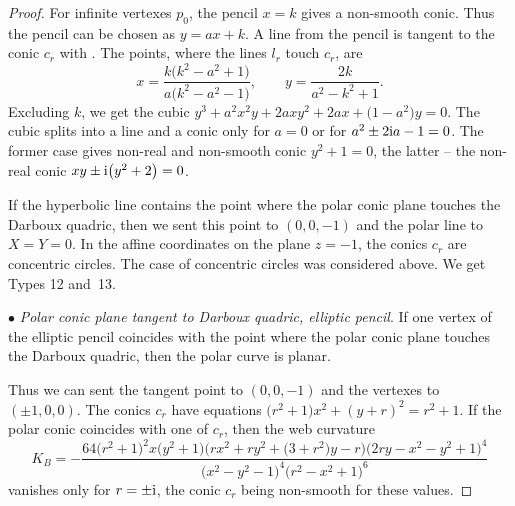 \documentclass[pdftex]{sigma}
\numberwithin{equation}{section}
\begin{document}
\begin{proof}
For infinite vertexes $p_0$, the pencil $x=k$ gives a non-smooth conic. Thus the pencil can be chosen as $y=ax+k$. A line from the pencil is tangent to the conic $c_r$ with
.
 The points, where the lines $l_r$ touch $c_r$, are
\[
x=\frac{k\bigl(k^2 -a^2+1\bigr)}{a\bigl(k^2-a^2-1\bigr)}, \qquad y=\frac{2k}{a^2 - k^2 + 1}.
\]
Excluding $k$, we get the cubic
$
y^3+a^2x^2y+2axy^2+2ax+\bigl(1-a^2\bigr)y=0$.
The cubic splits into a line and a conic only for $a=0$ or for $a^2 \pm 2{\rm i}a -1=0$. The former case gives non-real and non-smooth conic $y^2+1=0$, the latter -- the non-real conic $xy \pm {\rm i} \bigl(y^2+2\bigr)=0$.

 If the hyperbolic line contains the point where the polar conic plane touches the Darboux quadric, then we sent this point to $(0,0,-1)$ and the polar line to $X=Y=0$. In the affine coordinates on the plane $z=-1$, the conics $c_r$ are concentric circles. The case of concentric circles was considered above. We get Types 12 and~13.


$\bullet$ {\it Polar conic plane tangent to Darboux quadric, elliptic pencil}.
If one vertex of the elliptic pencil coincides with the point where the polar conic plane touches the Darboux quadric, then the polar curve is planar.

Thus we can sent the tangent point to $(0,0,-1)$ and the vertexes to $(\pm 1,0,0)$. The conics $c_r$ have equations
$
\bigl(r^2 + 1\bigr)x^2 + (y+r)^2 = r^2+1$.
If the polar conic coincides with one of $c_r$, then the web curvature
\[
K_B=-\frac{64\bigl(r^2 + 1\bigr)^2x\bigl(y^2 + 1\bigr)\bigl( rx^2 + ry^2+ \bigl(3+r^2\bigr)y - r \bigr)\bigl(2ry - x^2 - y^2 + 1\bigr)^4}{\bigl(x^2 - y^2 - 1\bigr)^4\bigl(r^2 - x^2 + 1\bigr)^6}
\]
vanishes only for $r=\pm {\rm i}$, the conic $c_r$ being non-smooth for these values.


\end{proof}
\end{document}
